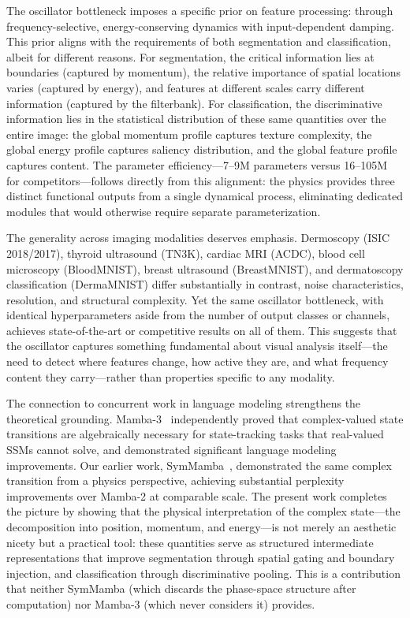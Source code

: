 \documentclass[11pt]{article}
\begin{document}
The oscillator bottleneck imposes a specific prior on feature processing: through frequency-selective, energy-conserving dynamics with input-dependent damping. This prior aligns with the requirements of both segmentation and classification, albeit for different reasons. For segmentation, the critical information lies at boundaries (captured by momentum), the relative importance of spatial locations varies (captured by energy), and features at different scales carry different information (captured by the filterbank). For classification, the discriminative information lies in the statistical distribution of these same quantities over the entire image: the global momentum profile captures texture complexity, the global energy profile captures saliency distribution, and the global feature profile captures content. The parameter efficiency---7--9M parameters versus 16--105M for competitors---follows directly from this alignment: the physics provides three distinct functional outputs from a single dynamical process, eliminating dedicated modules that would otherwise require separate parameterization.

The generality across imaging modalities deserves emphasis. Dermoscopy (ISIC\,2018/2017), thyroid ultrasound (TN3K), cardiac MRI (ACDC), blood cell microscopy (BloodMNIST), breast ultrasound (BreastMNIST), and dermatoscopy classification (DermaMNIST) differ substantially in contrast, noise characteristics, resolution, and structural complexity. Yet the same oscillator bottleneck, with identical hyperparameters aside from the number of output classes or channels, achieves state-of-the-art or competitive results on all of them. This suggests that the oscillator captures something fundamental about visual analysis itself---the need to detect where features change, how active they are, and what frequency content they carry---rather than properties specific to any modality.

The connection to concurrent work in language modeling strengthens the theoretical grounding. Mamba-3~\cite{mamba3} independently proved that complex-valued state transitions are algebraically necessary for state-tracking tasks that real-valued SSMs cannot solve, and demonstrated significant language modeling improvements. Our earlier work, SymMamba~\cite{symmamba2025}, demonstrated the same complex transition from a physics perspective, achieving substantial perplexity improvements over Mamba-2 at comparable scale. The present work completes the picture by showing that the physical interpretation of the complex state---the decomposition into position, momentum, and energy---is not merely an aesthetic nicety but a practical tool: these quantities serve as structured intermediate representations that improve segmentation through spatial gating and boundary injection, and classification through discriminative pooling. This is a contribution that neither SymMamba (which discards the phase-space structure after computation) nor Mamba-3 (which never considers it) provides.
\end{document}
